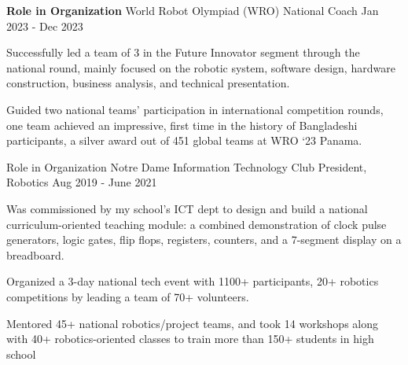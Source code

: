 

\begin{cventries}

  \cventryalt
    {\textbf{Role in Organization}} %
    {World Robot Olympiad (WRO)} %
    {National Coach} %
    {Jan 2023 - Dec 2023} %
    {
      \begin{cvitems} %
        \item {Successfully led a team of 3 in the Future Innovator segment through the national round, mainly focused on the robotic system, software design, hardware construction, business analysis, and technical presentation.}
        \item {Guided two national teams' participation in international competition rounds, one team achieved an impressive, first time in the history of Bangladeshi participants, a silver award out of 451 global teams at WRO ‘23 Panama.}
      \end{cvitems}
    }

  \cventryalt
    {Role in Organization} %
    { Notre Dame Information Technology Club} %
    {President, Robotics} %
    {Aug 2019 - June 2021} %
    {
      \begin{cvitems} %
        \item {Was commissioned by my school’s ICT dept to design and build a national curriculum-oriented teaching module: 
        a combined demonstration of clock pulse generators, logic gates, flip flops, registers, counters, and a 7-segment display on a breadboard.}
        \item {Organized a 3-day national tech event with 1100+ participants, 20+ robotics competitions by leading a team of 70+ volunteers.}
        \item {Mentored 45+ national robotics/project teams, and took 14 workshops along with 40+ robotics-oriented classes to train more than 150+ students in high school}
      \end{cvitems}
    }

\end{cventries}
